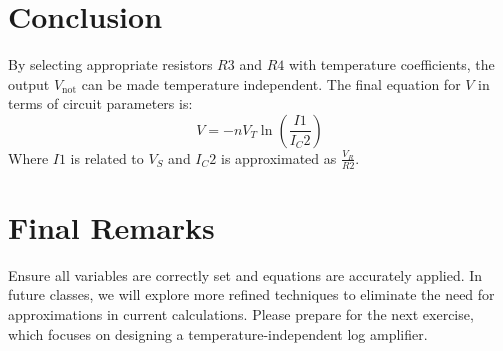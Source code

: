 \section{Conclusion}

By selecting appropriate resistors \( R3 \) and \( R4 \) with temperature coefficients, the output \( V_{\text{not}} \) can be made temperature independent. The final equation for \( V \) in terms of circuit parameters is:
\[
V = -n V_T \ln\left(\frac{I1}{I_C2}\right)
\]
Where \( I1 \) is related to \( V_S \) and \( I_C2 \) is approximated as \( \frac{V_R}{R2} \).

\section{Final Remarks}

Ensure all variables are correctly set and equations are accurately applied. In future classes, we will explore more refined techniques to eliminate the need for approximations in current calculations. Please prepare for the next exercise, which focuses on designing a temperature-independent log amplifier.

